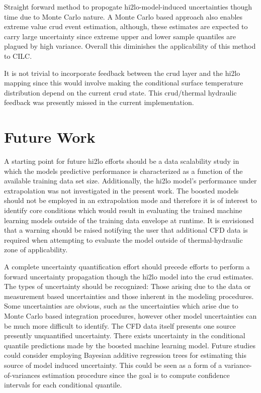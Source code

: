 Straight forward method to propogate hi2lo-model-induced uncertainties though time due to Monte Carlo nature.
A Monte Carlo based approach also enables extreme value crud event estimation, although, these estimates are expected to carry large uncertainty since extreme upper and lower sample quantiles are plagued by high variance.  Overall this diminishes the applicability of this method to CILC.  

It is not trivial to incorporate feedback between the crud layer and the hi2lo mapping since this would involve making the conditional surface temperature distribution depend on the current crud state.  This crud/thermal hydraulic feedback was presently missed in the current implementation.


\section{Future Work}

A starting point for future hi2lo efforts should be a data scalability study in which the models predictive performance is characterized as a function of the available training data set size.  Additionally,
the hi2lo model's performance under extrapolation was not investigated in the present work.  The boosted models should not be employed in an extrapolation mode and therefore it is of interest to identify core conditions which would result in evaluating the trained machine learning models outside of the training data envelope at runtime.  It is envisioned that a warning should be raised notifying the user that additional CFD data is required when attempting to evaluate the model outside of thermal-hydraulic zone of applicability.


A complete uncertainty quantification effort should precede efforts to perform a forward uncertainty propagation though the hi2lo model into the crud estimates.  The types of uncertainty should be recognized: Those arising due to the data or measurement based uncertainties and those inherent in the modeling procedures.  Some uncertainties are obvious, such as the uncertainties which arise due to Monte Carlo based integration procedures, however other model uncertainties can be much more difficult to identify.  The CFD data itself presents one source presently unquantified uncertainty.  There exists uncertainty in the conditional quantile predictions made by the boosted machine learning model.  Future studies could consider employing Bayesian additive regression trees for estimating this source of model induced uncertainty.  This could be seen as a form of a variance-of-variances estimation procedure since the goal is to compute confidence intervals for each conditional quantile.
    
